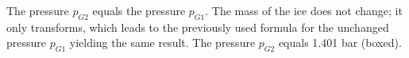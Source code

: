 The pressure \( p_{G2} \) equals the pressure \( p_{G1} \). The mass of the ice does not change; it only transforms, which leads to the previously used formula for the unchanged pressure \( p_{G1} \) yielding the same result. The pressure \( p_{G2} \) equals 1.401 bar (boxed).